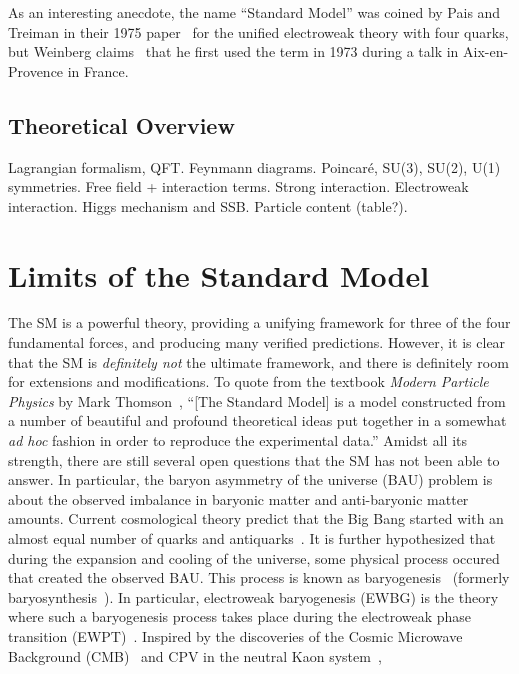 As an interesting anecdote, the name ``Standard Model'' was coined by Pais and Treiman in their 1975 paper~\cite{PaisTreiman1975SMName}
for the unified electroweak theory with four quarks,
but Weinberg claims~\cite{WeinbergInterview2018} that he first used the term in 1973 during a talk in Aix-en-Provence in France.

\subsection{Theoretical Overview}
Lagrangian formalism, QFT.
Feynmann diagrams.
Poincar\'{e}, SU(3), SU(2), U(1) symmetries.
Free field + interaction terms.
Strong interaction.
Electroweak interaction.
Higgs mechanism and SSB.
Particle content (table?).

\section{Limits of the Standard Model}
The SM is a powerful theory, providing a unifying framework for three of the four fundamental forces, and producing many verified predictions.
However, it is clear that the SM is \textit{definitely not} the ultimate framework, and there is definitely room for extensions and modifications.
To quote from the textbook \textit{Modern Particle Physics} by Mark Thomson~\cite{Thomson2013ParticleTextbook},
``[The Standard Model] is a model constructed from a number of beautiful and profound theoretical ideas
put together in a somewhat \textit{ad hoc} fashion in order to reproduce the experimental data.''
Amidst all its strength, there are still several open questions that the SM has not been able to answer.
In particular, the baryon asymmetry of the universe (BAU) problem is about the observed imbalance in baryonic matter and anti-baryonic matter amounts.
Current cosmological theory predict that the Big Bang started with an almost equal number of quarks and antiquarks~\cite{Sarkar2008AstroparticlePhysics}.
It is further hypothesized that during the expansion and cooling of the universe, some physical process occured that created the observed BAU.
This process is known as baryogenesis~\cite{Liddle2015Cosmology} (formerly baryosynthesis~\cite{BarrowTurner1981Baryosynthesis,Turner1981GUT}).
In particular, electroweak baryogenesis (EWBG) is the theory where such a baryogenesis process takes place during the electroweak phase transition (EWPT)~\cite{Kuzmin1985EWBG, Cohen1990EWBG}.
Inspired by the discoveries of the Cosmic Microwave Background (CMB)~\cite{PenziasWilson1965CMB} and CPV in the neutral Kaon system~\cite{CroninFitch1964KaonCPV},
